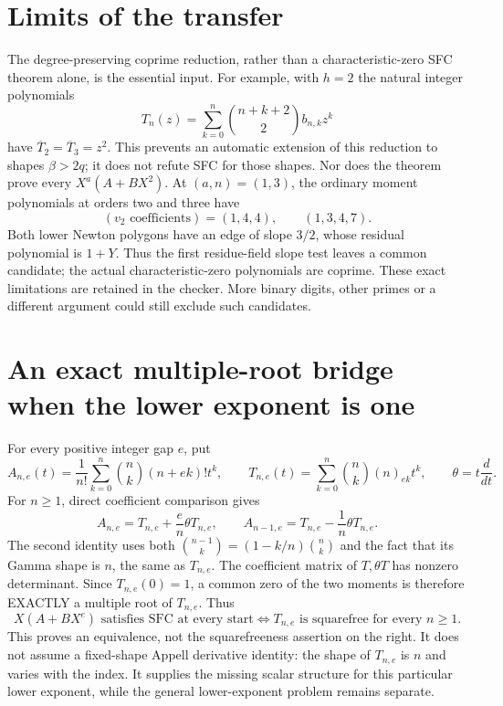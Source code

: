 \documentclass[11pt]{article}
\begin{document}
\section{Limits of the transfer}
The degree-preserving coprime reduction, rather than a characteristic-zero
SFC theorem alone, is the essential input. For example, with $h=2$ the
natural integer polynomials
\[
 T_n(z)=\sum_{k=0}^n\binom{n+k+2}{2}b_{n,k}z^k
\]
have $\overline T_2=\overline T_3=z^2$.
This prevents an automatic extension of this reduction to shapes
$\beta>2q$; it does not refute SFC for those shapes.
Nor does the theorem prove every $X^a(A+BX^2)$. At $(a,n)=(1,3)$,
the ordinary moment polynomials at orders two and three have
\[
 (v_2\text{ coefficients})=(1,4,4),\qquad(1,3,4,7).
\]
Both lower Newton polygons have an edge of slope $3/2$, whose residual
polynomial is $1+Y$. Thus the first residue-field slope test leaves a
common candidate; the actual characteristic-zero polynomials are coprime.
These exact limitations are retained in the checker. More binary digits,
other primes or a different argument could still exclude such candidates.

\section{An exact multiple-root bridge when the lower exponent is one}
For every positive integer gap $e$, put
\[
 A_{n,e}(t)=\frac1{n!}\sum_{k=0}^n\binom nk(n+ek)!t^k,
 \qquad T_{n,e}(t)=\sum_{k=0}^n\binom nk(n)_{ek}t^k,
 \qquad\theta=t\frac{d}{dt}.
\]
For $n\ge1$, direct coefficient comparison gives
\[
 A_{n,e}=T_{n,e}+\frac e n\theta T_{n,e},\qquad
 A_{n-1,e}=T_{n,e}-\frac1n\theta T_{n,e}.                  \tag{12}
\]
The second identity uses both $\binom{n-1}k=(1-k/n)\binom nk$ and
the fact that its Gamma shape is $n$, the same as $T_{n,e}$.
The coefficient matrix of $T,\theta T$ has nonzero determinant.
Since $T_{n,e}(0)=1$, a common zero of the two moments is therefore
EXACTLY a multiple root of $T_{n,e}$. Thus
\[
 X(A+BX^e)\text{ satisfies SFC at every start}
 \iff T_{n,e}\text{ is squarefree for every }n\ge1.         \tag{13}
\]
This proves an equivalence, not the squarefreeness assertion on the right.
It does not assume a fixed-shape Appell derivative identity: the shape
of $T_{n,e}$ is $n$ and varies with the index. It supplies the missing
scalar structure for this particular lower exponent, while the general
lower-exponent problem remains separate.
\end{document}
